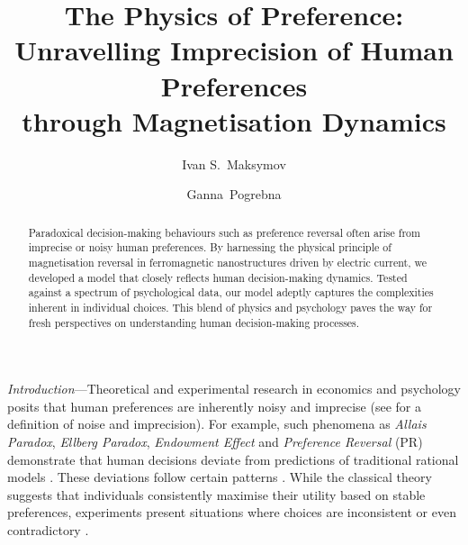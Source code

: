 \documentclass[aps,prl,reprint,superscriptaddress]{revtex4-2}
\begin{document}
\title{The Physics of Preference: Unravelling Imprecision of Human Preferences \\through Magnetisation Dynamics}

\author{Ivan S.~Maksymov}

\author{Ganna~Pogrebna}


\begin{abstract}
Paradoxical decision-making behaviours such as preference reversal often arise from imprecise or noisy human preferences. By harnessing the physical principle of magnetisation reversal in ferromagnetic nanostructures driven by electric current, we developed a model that closely reflects human decision-making dynamics. Tested against a spectrum of psychological data, our model adeptly captures the complexities inherent in individual choices. This blend of physics and psychology paves the way for fresh perspectives on understanding human decision-making processes.
\end{abstract}

\maketitle %

{\it Introduction}---Theoretical and experimental research in economics and psychology posits that human preferences are inherently noisy and imprecise \cite{Lin71} (see \cite{Bha17, loomes2017preference} for a definition of noise and imprecision). For example, such phenomena as \textit{Allais Paradox}, \textit{Ellberg Paradox}, \textit{Endowment Effect} and \textit{Preference Reversal} (PR) demonstrate that human decisions deviate from predictions of traditional rational models \cite{moffatt2009experimental}. These deviations follow certain patterns \cite{loomes2017preference}. While the classical theory suggests that individuals consistently maximise their utility based on stable preferences, experiments present situations where choices are inconsistent or even contradictory \cite{blavatskyy2010models, bardsley2009experimental}.
\end{document}
